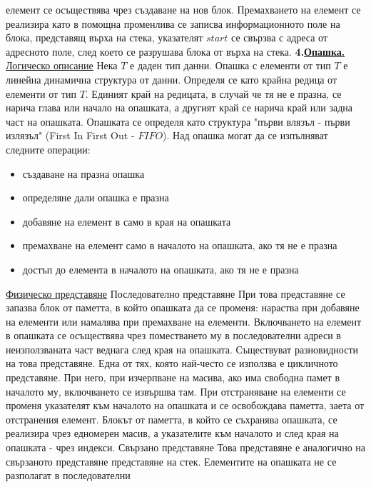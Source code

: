\documentclass{article}
\begin{document}
елемент се осъществява чрез създаване на нов блок. Премахването на елемент се реализира като в помощна променлива се записва
информационното поле на блока, представящ върха на стека, указателят $start$ се свързва с адреса от адресното поле, след което се
разрушава блока от върха на стека. \newline\newline
\textbf{4.\underline{Опашка.}} \newline\newline
\underline{Логическо описание} \newline
Нека $T$ е даден тип данни. Опашка с елементи от тип $T$ е линейна динамична структура от данни. Определя се като крайна редица
от елементи от тип $T$. Единият край на редицата, в случай че тя не е празна, се нарича глава или начало на опашката, а другият
край се нарича край или задна част на опашката. Опашката се определя като структура "първи влязъл - първи излязъл"
(First In First Out - $FIFO$). Над опашка могат да се изпълняват следните операции:
\begin{itemize}
    \item създаване на празна опашка
    \item определяне дали опашка е празна
    \item добавяне на елемент в само в края на опашката
    \item премахване на елемент само в началото на опашката, ако тя не е празна
    \item достъп до елемента в началото на опашката, ако тя не е празна
\end{itemize}
\underline{Физическо представяне} \newline
Последователно представяне
При това представяне се запазва блок от паметта, в който опашката да се променя: нараства при добавяне на елементи или намалява
при премахване на елементи. Включването на елемент в опашката се осъществява чрез поместването му в последователни адреси в
неизползваната част веднага след края на опашката. Съществуват разновидности на това представяне. Една от тях, която най-често се
използва е цикличното представяне. При него, при изчерпване на масива, ако има свободна памет в началото му, включването се
извършва там. При отстраняване на елементи се променя указателят към началото на опашката и се освобождава паметта, заета от
отстранения елемент. Блокът от паметта, в който се съхранява опашката, се реализира чрез едномерен масив, а указателите към началото
и след края на опашката - чрез индекси.
Свързано представяне
Това представяне е аналогично на свързаното представяне представяне на стек. Елементите на опашката не се разполагат в последователни
\end{document}
